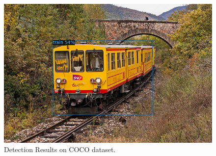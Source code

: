 \documentclass{article}
\begin{document}
\begin{figure}[h!]
\begin{minipage}{0.31\textwidth}
  \includegraphics[width=\textwidth, height=0.17\textheight]{./../../final_results/Coco/COCO_test2014_000000006499_10shot.png}
  \end{minipage}
  \caption{Detection Results on COCO dataset. }
  \label{coco_results}
\end{figure}
\end{document}
